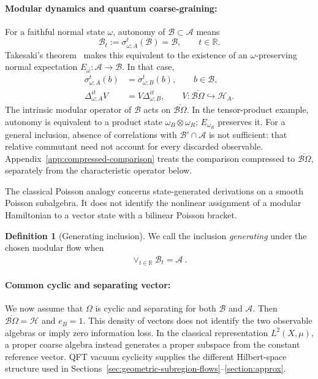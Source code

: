 \documentclass[a4paper,11pt]{article}
\theoremstyle{definition}
\newtheorem{definition}{Definition}[section]
\newcommand{\mA}{\mathcal{A}}
\newcommand{\mB}{\mathcal{B}}
\newcommand{\nn}{\nonumber}
\newcommand{\mH}{\mathcal{H}}
\begin{document}
\paragraph{Modular dynamics and quantum coarse-graining:}
For a faithful normal state $\omega$, autonomy of $\mB\subset\mA$ means
\begin{equation}\label{eq:quantum-coarse-autonomy}
 \mB_t:=\sigma_{\omega;A}^t(\mB)=\mB,\qquad t\in\mathbb R.
\end{equation}
Takesaki's theorem~\cite{Takesaki1972} makes this equivalent to the existence of
an $\omega$-preserving normal expectation $E_\omega:\mA\to\mB$. In that case,
\begin{align}
 \sigma_{\omega;A}^t(b)&=\sigma_{\omega;B}^t(b),\qquad b\in\mB,\nn\\
 \Delta_{\omega;A}^{it}V&=V\Delta_{\omega;B}^{it},
 \qquad V:\overline{\mB\Omega}\hookrightarrow\mH_A.
\end{align}
The intrinsic modular operator of $\mB$ acts on $\overline{\mB\Omega}$.
In the tensor-product example, autonomy is equivalent to a product state
$\omega_B\otimes\omega_R$; $E_{\omega_R}$ preserves it.
For a general inclusion, absence of correlations with $\mB'\cap\mA$ is not sufficient:
that relative commutant need not account for every discarded observable.
Appendix~\ref{app:compressed-comparison} treats the comparison compressed to
$\overline{\mB\Omega}$, separately from the characteristic operator below.

The classical Poisson analogy concerns state-generated derivations on a smooth
Poisson subalgebra. It does not identify the nonlinear assignment of a modular
Hamiltonian to a vector state with a bilinear Poisson bracket.

\begin{definition}[Generating inclusion]
We call the inclusion {\it generating} under the chosen modular flow when 
\begin{align}\label{geneating}
    \vee_{t\in \mathbb{R}}\mB_t=\mA\ .
\end{align}
\end{definition}


\paragraph{Common cyclic and separating vector:}
We now assume that $\Omega$ is cyclic and separating for both $\mB$ and $\mA$.
Then $\overline{\mB\Omega}=\mH$ and $e_B=1$. This density of vectors does not identify
the two observable algebras or imply zero information loss. In the classical
representation $L^2(X,\mu)$, a proper coarse algebra instead generates a proper
subspace from the constant reference vector. QFT vacuum cyclicity supplies the
different Hilbert-space structure used in Sections~\ref{sec:geometric-subregion-flows}--\ref{section:approx}.
\end{document}
